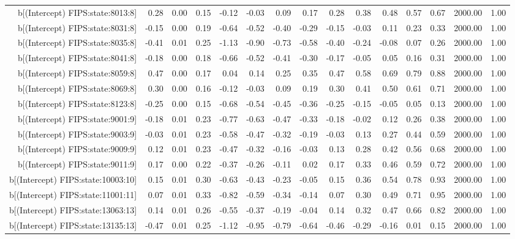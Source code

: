\begin{table}[ht]
\begin{tabular}{rrrrrrrrrrrrrrr}
  b[(Intercept) FIPS:state:8013:8] & 0.28 & 0.00 & 0.15 & -0.12 & -0.03 & 0.09 & 0.17 & 0.28 & 0.38 & 0.48 & 0.57 & 0.67 & 2000.00 & 1.00 \\ 
  b[(Intercept) FIPS:state:8031:8] & -0.15 & 0.00 & 0.19 & -0.64 & -0.52 & -0.40 & -0.29 & -0.15 & -0.03 & 0.11 & 0.23 & 0.33 & 2000.00 & 1.00 \\ 
  b[(Intercept) FIPS:state:8035:8] & -0.41 & 0.01 & 0.25 & -1.13 & -0.90 & -0.73 & -0.58 & -0.40 & -0.24 & -0.08 & 0.07 & 0.26 & 2000.00 & 1.00 \\ 
  b[(Intercept) FIPS:state:8041:8] & -0.18 & 0.00 & 0.18 & -0.66 & -0.52 & -0.41 & -0.30 & -0.17 & -0.05 & 0.05 & 0.16 & 0.31 & 2000.00 & 1.00 \\ 
  b[(Intercept) FIPS:state:8059:8] & 0.47 & 0.00 & 0.17 & 0.04 & 0.14 & 0.25 & 0.35 & 0.47 & 0.58 & 0.69 & 0.79 & 0.88 & 2000.00 & 1.00 \\ 
  b[(Intercept) FIPS:state:8069:8] & 0.30 & 0.00 & 0.16 & -0.12 & -0.03 & 0.09 & 0.19 & 0.30 & 0.41 & 0.50 & 0.61 & 0.71 & 2000.00 & 1.00 \\ 
  b[(Intercept) FIPS:state:8123:8] & -0.25 & 0.00 & 0.15 & -0.68 & -0.54 & -0.45 & -0.36 & -0.25 & -0.15 & -0.05 & 0.05 & 0.13 & 2000.00 & 1.00 \\ 
  b[(Intercept) FIPS:state:9001:9] & -0.18 & 0.01 & 0.23 & -0.77 & -0.63 & -0.47 & -0.33 & -0.18 & -0.02 & 0.12 & 0.26 & 0.38 & 2000.00 & 1.00 \\ 
  b[(Intercept) FIPS:state:9003:9] & -0.03 & 0.01 & 0.23 & -0.58 & -0.47 & -0.32 & -0.19 & -0.03 & 0.13 & 0.27 & 0.44 & 0.59 & 2000.00 & 1.00 \\ 
  b[(Intercept) FIPS:state:9009:9] & 0.12 & 0.01 & 0.23 & -0.47 & -0.32 & -0.16 & -0.03 & 0.13 & 0.28 & 0.42 & 0.56 & 0.68 & 2000.00 & 1.00 \\ 
  b[(Intercept) FIPS:state:9011:9] & 0.17 & 0.00 & 0.22 & -0.37 & -0.26 & -0.11 & 0.02 & 0.17 & 0.33 & 0.46 & 0.59 & 0.72 & 2000.00 & 1.00 \\ 
  b[(Intercept) FIPS:state:10003:10] & 0.15 & 0.01 & 0.30 & -0.63 & -0.43 & -0.23 & -0.05 & 0.15 & 0.36 & 0.54 & 0.78 & 0.93 & 2000.00 & 1.00 \\ 
  b[(Intercept) FIPS:state:11001:11] & 0.07 & 0.01 & 0.33 & -0.82 & -0.59 & -0.34 & -0.14 & 0.07 & 0.30 & 0.49 & 0.71 & 0.95 & 2000.00 & 1.00 \\ 
  b[(Intercept) FIPS:state:13063:13] & 0.14 & 0.01 & 0.26 & -0.55 & -0.37 & -0.19 & -0.04 & 0.14 & 0.32 & 0.47 & 0.66 & 0.82 & 2000.00 & 1.00 \\ 
  b[(Intercept) FIPS:state:13135:13] & -0.47 & 0.01 & 0.25 & -1.12 & -0.95 & -0.79 & -0.64 & -0.46 & -0.29 & -0.16 & 0.01 & 0.15 & 2000.00 & 1.00 \\ 

\end{tabular}
\end{table}
